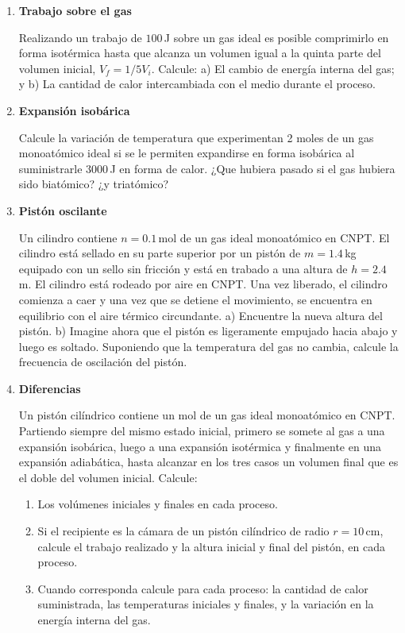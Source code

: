 \documentclass[a4paper,12pt]{article}
\begin{document}
\begin{enumerate}
	\item {\bf{Trabajo sobre el gas}}

		Realizando un trabajo de $100$\,J sobre un gas ideal es posible
		comprimirlo en forma isotérmica hasta que alcanza un volumen igual a la
		quinta parte del volumen inicial, $V_f = 1/5 V_i$. Calcule: a) El
		cambio de energía interna del gas; y b) La cantidad de calor
		intercambiada con el medio durante el proceso. 
	
	\item {\bf{Expansión isobárica}}
		
		Calcule la variación de temperatura que experimentan 2 moles de un gas
		monoatómico ideal si se le permiten expandirse en forma isobárica al
		suministrarle $3000$\,J en forma de calor. ¿Que hubiera pasado si el
		gas hubiera sido biatómico? ¿y triatómico?
	
	\item {\bf{Pistón oscilante}}

		Un cilindro contiene $n=0.1$\,mol de un gas ideal monoatómico en CNPT.
		El cilindro está sellado en su parte superior por un pistón de
		$m=1.4$\,kg equipado con un sello sin fricción y está en trabado a una
		altura de $h=2.4$\,m. El cilindro está rodeado por aire en CNPT. Una
		vez liberado, el cilindro comienza a caer y una vez que se detiene el
		movimiento, se encuentra en equilibrio con el aire térmico circundante.
		a) Encuentre la nueva altura del pistón. b) Imagine ahora que el pistón
		es ligeramente empujado hacia abajo y luego es soltado. Suponiendo que
		la temperatura del gas no cambia, calcule la frecuencia de oscilación
		del pistón.
	
	\item {\bf{Diferencias}}
		
		Un pistón cilíndrico contiene un mol de un gas ideal monoatómico en
		CNPT.  Partiendo siempre del mismo estado inicial, primero se somete al
		gas a una expansión isobárica, luego a una expansión isotérmica y
		finalmente en una expansión adiabática, hasta alcanzar en los tres
		casos un volumen final que es el doble del volumen inicial. Calcule: 
		\begin{enumerate}
			\item Los volúmenes iniciales y finales en cada proceso.
			\item Si el recipiente es la cámara de un pistón cilíndrico de
				radio $r=10$\,cm, calcule el trabajo realizado y la altura
				inicial y final del pistón, en cada proceso.
			\item Cuando corresponda calcule para cada proceso: la cantidad de
				calor suministrada, las temperaturas iniciales y finales, y la
				variación en la energía interna del gas.
		\end{enumerate}


\end{enumerate}
\end{document}
